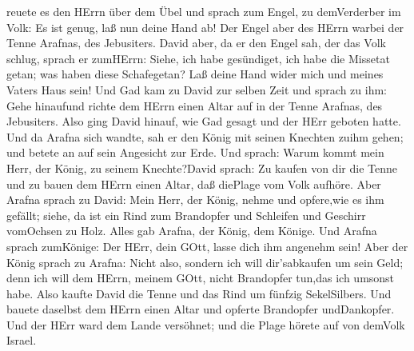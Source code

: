 reuete es den HErrn über dem Übel und sprach zum Engel, zu demVerderber
im Volk: Es ist genug, laß nun deine Hand ab! Der Engel aber des HErrn
warbei der Tenne Arafnas, des Jebusiters.  David aber, da
er den Engel sah, der das Volk schlug, sprach er zumHErrn: Siehe, ich
habe gesündiget, ich habe die Missetat getan; was haben diese
Schafegetan? Laß deine Hand wider mich und meines Vaters Haus sein!
 Und Gad kam zu David zur selben Zeit und sprach zu ihm:
Gehe hinaufund richte dem HErrn einen Altar auf in der Tenne Arafnas,
des Jebusiters.  Also ging David hinauf, wie Gad gesagt und
der HErr geboten hatte.  Und da Arafna sich wandte, sah er
den König mit seinen Knechten zuihm gehen; und betete an auf sein
Angesicht zur Erde.  Und sprach: Warum kommt mein Herr, der
König, zu seinem Knechte?David sprach: Zu kaufen von dir die Tenne und
zu bauen dem HErrn einen Altar, daß diePlage vom Volk aufhöre.
 Aber Arafna sprach zu David: Mein Herr, der König, nehme
und opfere,wie es ihm gefällt; siehe, da ist ein Rind zum Brandopfer und
Schleifen und Geschirr vomOchsen zu Holz.  Alles gab
Arafna, der König, dem Könige. Und Arafna sprach zumKönige: Der HErr,
dein GOtt, lasse dich ihm angenehm sein!  Aber der König
sprach zu Arafna: Nicht also, sondern ich will dir'sabkaufen um sein
Geld; denn ich will dem HErrn, meinem GOtt, nicht Brandopfer tun,das ich
umsonst habe. Also kaufte David die Tenne und das Rind um fünfzig
SekelSilbers.  Und bauete daselbst dem HErrn einen Altar
und opferte Brandopfer undDankopfer. Und der HErr ward dem Lande
versöhnet; und die Plage hörete auf von demVolk Israel.
